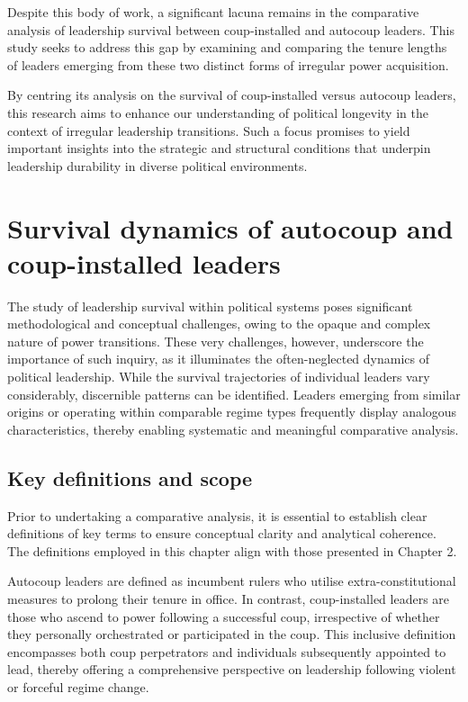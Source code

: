 \documentclass[
  12pt,
]{report}
\begin{document}
Despite this body of work, a significant lacuna remains in the
comparative analysis of leadership survival between coup-installed and
autocoup leaders. This study seeks to address this gap by examining and
comparing the tenure lengths of leaders emerging from these two distinct
forms of irregular power acquisition.

By centring its analysis on the survival of coup-installed versus
autocoup leaders, this research aims to enhance our understanding of
political longevity in the context of irregular leadership transitions.
Such a focus promises to yield important insights into the strategic and
structural conditions that underpin leadership durability in diverse
political environments.

\section{Survival dynamics of autocoup and coup-installed
leaders}\label{survival-dynamics-of-autocoup-and-coup-installed-leaders}

The study of leadership survival within political systems poses
significant methodological and conceptual challenges, owing to the
opaque and complex nature of power transitions. These very challenges,
however, underscore the importance of such inquiry, as it illuminates
the often-neglected dynamics of political leadership. While the survival
trajectories of individual leaders vary considerably, discernible
patterns can be identified. Leaders emerging from similar origins or
operating within comparable regime types frequently display analogous
characteristics, thereby enabling systematic and meaningful comparative
analysis.

\subsection*{Key definitions and scope}\label{key-definitions-and-scope}

Prior to undertaking a comparative analysis, it is essential to
establish clear definitions of key terms to ensure conceptual clarity
and analytical coherence. The definitions employed in this chapter align
with those presented in Chapter 2.

Autocoup leaders are defined as incumbent rulers who utilise
extra-constitutional measures to prolong their tenure in office. In
contrast, coup-installed leaders are those who ascend to power following
a successful coup, irrespective of whether they personally orchestrated
or participated in the coup. This inclusive definition encompasses both
coup perpetrators and individuals subsequently appointed to lead,
thereby offering a comprehensive perspective on leadership following
violent or forceful regime change.
\end{document}
